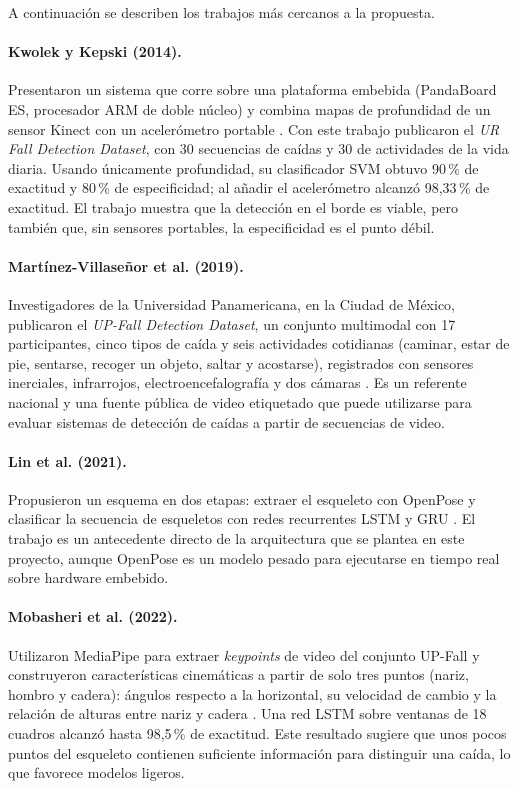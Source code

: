 \documentclass[12pt,a4paper,oneside]{book}
\theoremstyle{plain}
\theoremstyle{definition}
\theoremstyle{remark}
\begin{document}
A continuación se describen los trabajos más cercanos a la propuesta.

\paragraph{Kwolek y Kepski (2014).} Presentaron un sistema que corre sobre una plataforma embebida (PandaBoard ES, procesador ARM de doble núcleo) y combina mapas de profundidad de un sensor Kinect con un acelerómetro portable \parencite{kwolek2014human}. Con este trabajo publicaron el \textit{UR Fall Detection Dataset}, con 30 secuencias de caídas y 30 de actividades de la vida diaria. Usando únicamente profundidad, su clasificador SVM obtuvo 90\,\% de exactitud y 80\,\% de especificidad; al añadir el acelerómetro alcanzó 98,33\,\% de exactitud. El trabajo muestra que la detección en el borde es viable, pero también que, sin sensores portables, la especificidad es el punto débil.

\paragraph{Martínez-Villaseñor et al. (2019).} Investigadores de la Universidad Panamericana, en la Ciudad de México, publicaron el \textit{UP-Fall Detection Dataset}, un conjunto multimodal con 17 participantes, cinco tipos de caída y seis actividades cotidianas (caminar, estar de pie, sentarse, recoger un objeto, saltar y acostarse), registrados con sensores inerciales, infrarrojos, electroencefalografía y dos cámaras \parencite{martinez2019upfall}. Es un referente nacional y una fuente pública de video etiquetado que puede utilizarse para evaluar sistemas de detección de caídas a partir de secuencias de video.

\paragraph{Lin et al. (2021).} Propusieron un esquema en dos etapas: extraer el esqueleto con OpenPose y clasificar la secuencia de esqueletos con redes recurrentes LSTM y GRU \parencite{lin2021openpose}. El trabajo es un antecedente directo de la arquitectura que se plantea en este proyecto, aunque OpenPose es un modelo pesado para ejecutarse en tiempo real sobre hardware embebido.

\paragraph{Mobasheri et al. (2022).} Utilizaron MediaPipe para extraer \textit{keypoints} de video del conjunto UP-Fall y construyeron características cinemáticas a partir de solo tres puntos (nariz, hombro y cadera): ángulos respecto a la horizontal, su velocidad de cambio y la relación de alturas entre nariz y cadera \parencite{mobasheri2022fall}. Una red LSTM sobre ventanas de 18 cuadros alcanzó hasta 98,5\,\% de exactitud. Este resultado sugiere que unos pocos puntos del esqueleto contienen suficiente información para distinguir una caída, lo que favorece modelos ligeros.
\end{document}
